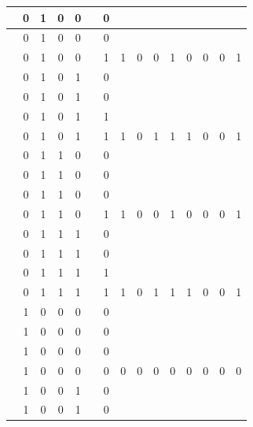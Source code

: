 \begin{table}[!tb]
\begin{tabular}{|c|c|c|c|c|c|c|c|c|c|c|c|c|c|c|}
        \rowcolor{yellow!40}  & 0 & 1 & 0 & 0 &  & 0 &  &  &  &  &  &  &  &  \\ \hline
        \rowcolor{yellow!40}  & 0 & 1 & 0 & 0 &  & 0 &  &  &  &  &  &  &  &  \\ \hline
        \rowcolor{yellow!40}  & 0 & 1 & 0 & 0 &  & 1 & 1 & 0 & 0 & 1 & 0 & 0 & 0 & 1 \\ \hline
        \rowcolor{gray!40}  & 0 & 1 & 0 & 1 &  & 0 &  &  &  &  &  &  &  &  \\ \hline
        \rowcolor{gray!40}  & 0 & 1 & 0 & 1 &  & 0 &  &  &  &  &  &  &  &  \\ \hline
        \rowcolor{gray!40}  & 0 & 1 & 0 & 1 &  & 1 &  &  &  &  &  &  &  &  \\ \hline
        \rowcolor{gray!40}  & 0 & 1 & 0 & 1 &  & 1 & 1 & 0 & 1 & 1 & 1 & 0 & 0 & 1 \\ \hline
        \rowcolor{blue!40}  & 0 & 1 & 1 & 0 &  & 0 &  &  &  &  &  &  &  &  \\ \hline
        \rowcolor{blue!40}  & 0 & 1 & 1 & 0 &  & 0 &  &  &  &  &  &  &  &  \\ \hline
        \rowcolor{blue!40}  & 0 & 1 & 1 & 0 &  & 0 &  &  &  &  &  &  &  &  \\ \hline
        \rowcolor{blue!40}  & 0 & 1 & 1 & 0 &  & 1 & 1 & 0 & 0 & 1 & 0 & 0 & 0 & 1 \\ \hline
        \rowcolor{red!40}  & 0 & 1 & 1 & 1 &  & 0 &  &  &  &  &  &  &  &  \\ \hline
        \rowcolor{red!40}  & 0 & 1 & 1 & 1 &  & 0 &  &  &  &  &  &  &  &  \\ \hline
        \rowcolor{red!40}  & 0 & 1 & 1 & 1 &  & 1 &  &  &  &  &  &  &  &  \\ \hline
        \rowcolor{red!40}  & 0 & 1 & 1 & 1 &  & 1 & 1 & 0 & 1 & 1 & 1 & 0 & 0 & 1 \\ \hline
        \rowcolor{green!40}  & 1 & 0 & 0 & 0 &  & 0 &  &  &  &  &  &  &  &  \\ \hline
        \rowcolor{green!40}  & 1 & 0 & 0 & 0 &  & 0 &  &  &  &  &  &  &  &  \\ \hline
        \rowcolor{green!40}  & 1 & 0 & 0 & 0 &  & 0 &  &  &  &  &  &  &  &  \\ \hline
        \rowcolor{green!40}  & 1 & 0 & 0 & 0 &  & 0 & 0 & 0 & 0 & 0 & 0 & 0 & 0 & 0 \\ \hline
        \rowcolor{yellow!40}  & 1 & 0 & 0 & 1 &  & 0 &  &  &  &  &  &  &  &  \\ \hline
        \rowcolor{yellow!40}  & 1 & 0 & 0 & 1 &  & 0 &  &  &  &  &  &  &  &  \\ \hline

\end{tabular}
\end{table}
